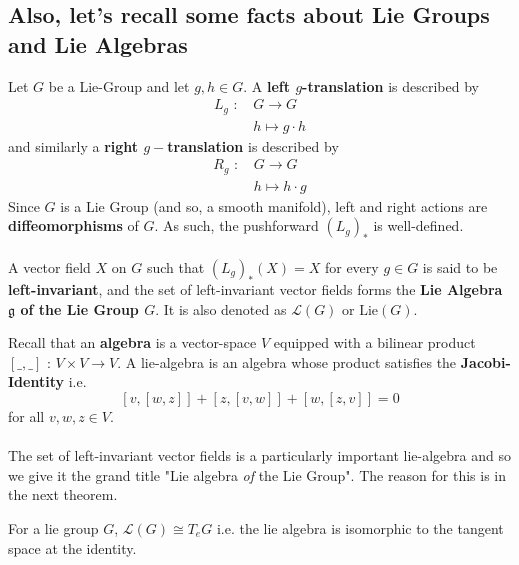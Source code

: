 \documentclass[11pt]{article}
\begin{document}
\vskip 0.5cm
\subsection*{Also, let's recall some facts about Lie Groups and Lie Algebras}

Let $G$ be a Lie-Group and let $g, h \in G$. A \textbf{left $g$-translation} is described by 
\begin{align*}
    L_g \text{ : } &G \rightarrow G \\
    &h \mapsto g \cdot h
\end{align*} and similarly a \textbf{right $g-$translation} is described by 
\begin{align*}
    R_g \text{ : } &G \rightarrow G \\
    &h \mapsto  h \cdot g
\end{align*} Since $G$ is a Lie Group (and so, a smooth manifold), left and right actions are \textbf{diffeomorphisms} of $G$. As such, the pushforward $(L_g)_*$ is well-defined. 
\\
\\
A vector field $X$ on $G$ such that $(L_g)_*(X) = X$ for every $g \in G$ is said to be \textbf{left-invariant}, and the set of left-invariant vector fields forms the \textbf{Lie Algebra $\mathfrak{g}$ of the Lie Group $G$}. It is also denoted as $\mathcal{L}(G)$ or $\mathrm{Lie}(G)$.

\begin{bluebox}
    Recall that an \textbf{algebra} is a vector-space $V$ equipped with a bilinear product $[ \_, \_ ] \text{ : } V \times V \rightarrow V$. A lie-algebra is an algebra whose product satisfies the \textbf{Jacobi-Identity} i.e. \[ [v, [w , z]] + [z, [v, w]] + [w, [z, v]] = 0 \] for all $v, w, z \in V$.
    \\
    \\
    The set of left-invariant vector fields is a particularly important lie-algebra and so we give it the grand title "Lie algebra \textit{of} the Lie Group". The reason for this is in the next theorem.
\end{bluebox}

\vskip 0.5cm
\begin{redbox}
    \begin{theorem}
        For a lie group $G$, $\mathcal{L}(G) \cong T_e G$ i.e. the lie algebra is isomorphic to the tangent space at the identity. 
    \end{theorem}
\end{redbox}
\end{document}
